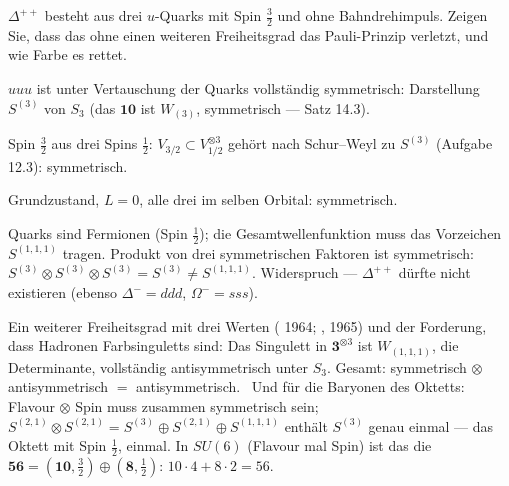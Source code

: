 \begin{aufgabe}
$\Delta^{++}$ besteht aus drei $u$-Quarks mit Spin $\frac32$ und ohne Bahndrehimpuls. Zeigen Sie, dass das ohne einen weiteren Freiheitsgrad das Pauli-Prinzip verletzt, und wie Farbe es rettet.

\loesung
{}
$uuu$ ist unter Vertauschung der Quarks vollständig symmetrisch: Darstellung $S^{(3)}$ von $S_3$ (das $\mathbf{10}$ ist $W_{(3)}$, symmetrisch --- Satz 14.3).

Spin $\frac32$ aus drei Spins $\frac12$: $V_{3/2}\subset V_{1/2}^{\otimes3}$ gehört nach Schur--Weyl zu $S^{(3)}$ (Aufgabe 12.3): symmetrisch.

Grundzustand, $L = 0$, alle drei im selben Orbital: symmetrisch.

Quarks sind Fermionen (Spin $\frac12$); die Gesamtwellenfunktion muss das Vorzeichen $S^{(1,1,1)}$ tragen. Produkt von drei symmetrischen Faktoren ist symmetrisch: $S^{(3)}\otimes S^{(3)}\otimes S^{(3)} = S^{(3)}\neq S^{(1,1,1)}$. Widerspruch --- $\Delta^{++}$ dürfte nicht existieren (ebenso $\Delta^{-} = ddd$, $\Omega^{-} = sss$).

Ein weiterer Freiheitsgrad mit drei Werten ( 1964; ,  1965) und der Forderung, dass Hadronen Farbsinguletts sind: Das Singulett in $\mathbf 3^{\otimes3}$ ist $W_{(1,1,1)}$, die Determinante, vollständig antisymmetrisch unter $S_3$. Gesamt: symmetrisch $\otimes$ antisymmetrisch $=$ antisymmetrisch. \checkmark\ Und für die Baryonen des Oktetts: Flavour $\otimes$ Spin muss zusammen symmetrisch sein; $S^{(2,1)}\otimes S^{(2,1)} = S^{(3)}\oplus S^{(2,1)}\oplus S^{(1,1,1)}$ enthält $S^{(3)}$ genau einmal --- das Oktett mit Spin $\frac12$, einmal. In $SU(6)$ (Flavour mal Spin) ist das die $\mathbf{56} = (\mathbf{10}, \tfrac32)\oplus(\mathbf 8, \tfrac12)$: $10\cdot4 + 8\cdot2 = 56$. \checkmark

\begin{center}
\begin{minipage}{0.88\textwidth}
\end{minipage}
\end{center}
\end{aufgabe}

